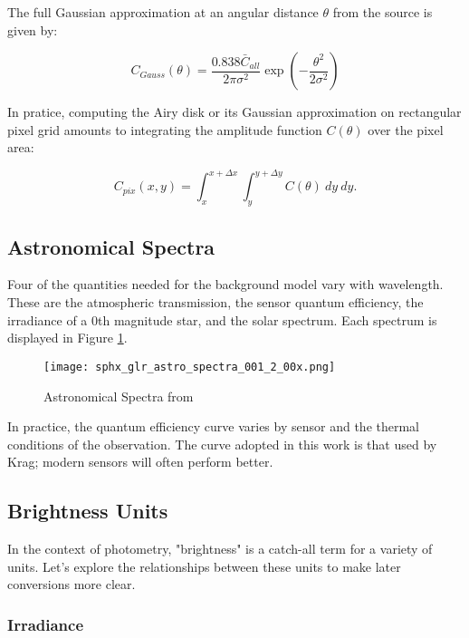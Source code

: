 The full Gaussian approximation at an angular distance $\theta$ from the source is given by:

\begin{equation} \label{eq:airy_gaussian}
  C_{Gauss}(\theta) = \frac{0.838 \bar{C}_{all}}{2 \pi \sigma^2} \exp\left( - \frac{\theta^2}{2 \sigma^2} \right)
\end{equation}

In pratice, computing the Airy disk or its Gaussian approximation on rectangular pixel grid amounts to integrating the amplitude function $C(\theta)$ over the pixel area:

\begin{equation}
  C_{pix}(x, y) = \int_{x}^{x + \Delta x} \int_{y}^{y + \Delta y}{C(\theta)} \: dy \: dy.
\end{equation}



\subsection{Astronomical Spectra}

Four of the quantities needed for the background model vary with wavelength. These are the atmospheric transmission, the sensor quantum efficiency, the irradiance of a 0th magnitude star, and the solar spectrum. Each spectrum is displayed in Figure \ref{fig:spectra}.

\begin{figure}[ht]
  \centering
  \texttt{[image: sphx\_glr\_astro\_spectra\_001\_2\_00x.png]}
  \caption{Astronomical Spectra from \cite{krag2003}}
  \label{fig:spectra}
\end{figure}

In practice, the quantum efficiency curve varies by sensor and the thermal conditions of the
observation. The curve adopted in this work is that used by Krag; modern sensors will often
perform better.

\subsection{Brightness Units}

In the context of photometry, "brightness" is a catch-all term for a variety of units. Let's explore the relationships between these units to make later conversions more clear.

\subsubsection{Irradiance}

